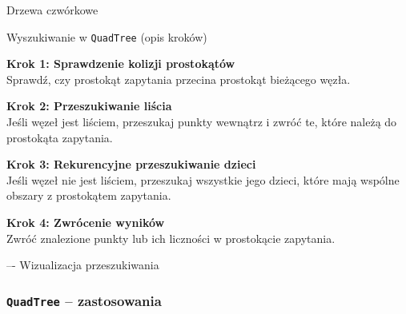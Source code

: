 \documentclass[aspectratio=1610, polish]{beamer}
\begin{document}
\begin{section}{Drzewa czwórkowe }
\begin{frame}{Wyszukiwanie w \texttt{QuadTree} (opis kroków)}

\begin{mdframed}
\textbf{Krok 1: Sprawdzenie kolizji prostokątów}\\[3pt]
Sprawdź, czy prostokąt zapytania przecina prostokąt bieżącego węzła.
\end{mdframed}

\begin{mdframed}
\textbf{Krok 2: Przeszukiwanie liścia}\\[3pt]
Jeśli węzeł jest liściem, przeszukaj punkty wewnątrz i zwróć te, które należą do prostokąta zapytania.
\end{mdframed}

\begin{mdframed}
\textbf{Krok 3: Rekurencyjne przeszukiwanie dzieci}\\[3pt]
Jeśli węzeł nie jest liściem, przeszukaj wszystkie jego dzieci, które mają wspólne obszary z prostokątem zapytania.
\end{mdframed}

\begin{mdframed}
\textbf{Krok 4: Zwrócenie wyników}\\[3pt]
Zwróć znalezione punkty lub ich liczności w prostokącie zapytania.
\end{mdframed}

\end{frame}

\begin{frame}{ –- Wizualizacja przeszukiwania}

    \centering
\end{frame}


\begin{frame}
\frametitle{\texttt{QuadTree} -- zastosowania}


\end{frame}
\end{section}
\end{document}
